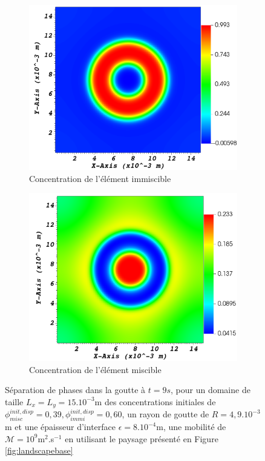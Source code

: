 \begin{figure}[H]
	\centering
	\begin{subfigure}[H]{0.4\textwidth}
		\centering
		\includegraphics[width=1\textwidth]{figure/separation_immi.png}
		\caption{Concentration de l'élément immiscible}
		\label{fig:y equals x}
	\end{subfigure} \hfil
	\begin{subfigure}[H]{0.4\textwidth}
		\centering
		\includegraphics[width=1\textwidth]{figure/separation_misc.png}
		\caption{Concentration de l'élément miscible}
		\label{fig:y equals x}
	\end{subfigure}
	\caption{Séparation de phases dans la goutte à $t=9s$, pour un domaine de taille $L_x = L_y = 15.10^{-3}$m des concentrations initiales de $\phi^{init,disp}_{misc} = 0,39,\phi^{init,disp}_{immi} = 0,60 $, un rayon de goutte de $R = 4,9.10^{-3}$m et une épaisseur d'interface $\epsilon = 8.10^{-4}$m, une mobilité de $\mathcal{M} = 10^{9}$m$^2$.s$^{-1}$ en utilisant le paysage présenté en Figure \ref{fig:landscapebase}}
	\label{land_base_sep}
\end{figure} \vspace{-0.5cm}
